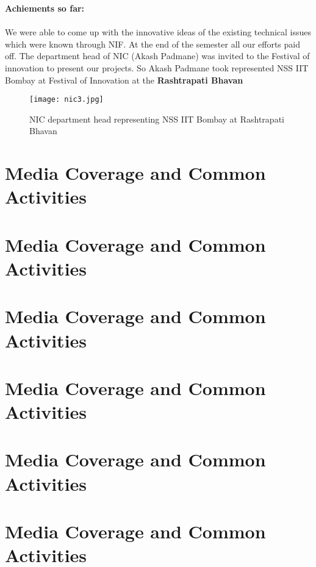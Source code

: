 \noindent \textbf{\Large Achiements so far:}\\ \\{
We were able to come up with the innovative ideas of the existing technical issues which were known through NIF. At the end of the semester all our efforts paid off. The department head of NIC (Akash Padmane) was invited to the Festival of innovation to present our projects. So Akash Padmane took represented NSS IIT Bombay at Festival of Innovation at the \textbf{Rashtrapati Bhavan}}


\begin{figure}[H]
\centering
\texttt{[image: nic3.jpg]}
\caption*{NIC department head representing NSS IIT Bombay at Rashtrapati Bhavan}
\end{figure}

\chapter*{\huge Media Coverage and Common Activities}

\pagebreak
\chapter*{\huge Media Coverage and Common Activities}


\pagebreak
\chapter*{\huge Media Coverage and Common Activities}


\pagebreak
\chapter*{\huge Media Coverage and Common Activities}


\pagebreak
\chapter*{\huge Media Coverage and Common Activities}


\pagebreak
\chapter*{\huge Media Coverage and Common Activities}


